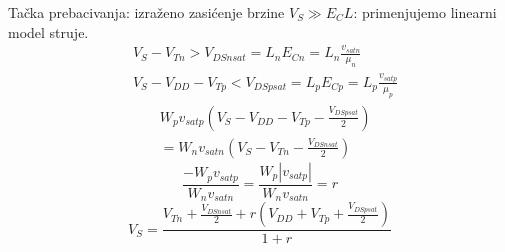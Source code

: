 \begin{frame}[label=09_2-s044]{Tačka prebacivanja: izraženo zasićenje brzine}
\setlength{\abovedisplayskip}{3pt}\setlength{\belowdisplayskip}{2pt}
$V_S\gg E_CL$: primenjujemo linearni model struje.\[\begin{aligned}&V_S-V_{Tn}>V_{DSnsat}=L_nE_{Cn}=L_n\frac{v_{satn}}{\mu_n}\\& V_S-V_{DD}-V_{Tp}<V_{DSpsat}=L_pE_{Cp}=L_p\frac{v_{satp}}{\mu_p}\end{aligned}\]
\[\begin{aligned}&W_pv_{satp}\left(V_S-V_{DD}-V_{Tp}-\frac{V_{DSpsat}}2\right)\\&=W_nv_{satn}\left(V_S-V_{Tn}-\frac{V_{DSnsat}}2\right)\end{aligned}\]
\[\frac{-W_pv_{satp}}{W_nv_{satn}}=\frac{W_p|v_{satp}|}{W_nv_{satn}}=r\]
\[V_S=\frac{V_{Tn}+\frac{V_{DSnsat}}2+r\left(V_{DD}+V_{Tp}+\frac{V_{DSpsat}}2\right)}{1+r}\]

\end{frame}
